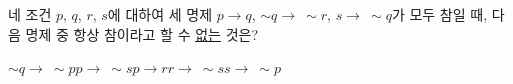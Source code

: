 네 조건 $p$, $q$, $r$, $s$에 대하여 세 명제 $p\longrightarrow q$, $\sim q\longrightarrow\ \sim r$, $s\longrightarrow\ \sim q$가 모두 참일 때, 다음 명제 중 항상 참이라고 할 수 \underline{없는} 것은?
\begin{choices32}{$\sim q\longrightarrow\ \sim p$}{$p\longrightarrow\ \sim s$}{$p\longrightarrow r$}{$r\longrightarrow\ \sim s$}{$s\longrightarrow\ \sim p$}\end{choices32}
